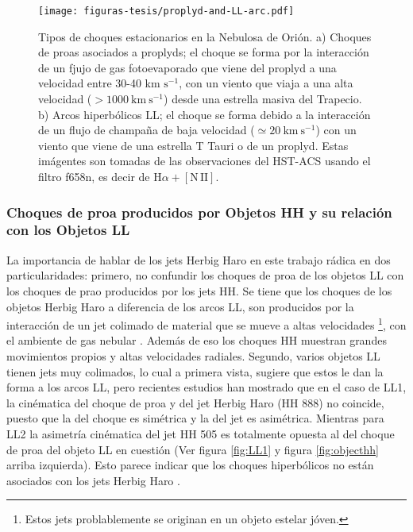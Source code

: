 \documentclass{article}
\newcommand\ha{\ensuremath{\mathrm{H}\alpha}}
\newcommand\nii{\ensuremath{\mathrm{[N\,II]}}}
\begin{document}
\begin{figure}
  \centering
  \texttt{[image: figuras-tesis/proplyd-and-LL-arc.pdf]}
  \caption{Tipos de choques estacionarios en la Nebulosa de Orión. a) Choques de proas asociados a proplyds; el choque se forma por la interacción de un fjujo de gas fotoevaporado que viene del proplyd a una velocidad entre 30-40 km \(\text{s}^{-1}\), con un viento que viaja a una alta velocidad (\(>1000 ~\text{km} ~\text{s}^{-1}\)) desde una estrella masiva del Trapecio. b) Arcos hiperbólicos LL; el choque se forma debido a la interacción de un flujo de champaña de baja velocidad (\(\simeq 20~\text{km} ~\text{s}^{-1}\)) con un viento que viene de una estrella T Tauri o de un proplyd. Estas imágentes son tomadas de las observaciones del HST-ACS usando el filtro f658n, es decir de \(\ha + \nii\). }
  \label{fig:proplydbow-objetoll}
\end{figure}

\subsubsection{Choques de proa producidos por  Objetos HH y su relación con los Objetos LL}
\label{sec:herbig}

La importancia de hablar de los jets Herbig Haro en este trabajo rádica en dos particularidades: primero, no confundir los choques de proa de los objetos LL con los choques de prao producidos por los jets HH. Se tiene que los choques de los objetos Herbig Haro a diferencia de los arcos LL, son producidos por la interacción de un jet colimado de material que se mueve a altas velocidades \footnote{Estos jets problablemente se originan en un objeto estelar jóven.}, con el ambiente de gas nebular \citep{Odell:1994}. Además de eso los choques HH muestran grandes movimientos propios y altas velocidades radiales. Segundo, varios objetos LL tienen jets muy colimados, lo cual a primera vista, sugiere que estos le dan la forma a los arcos LL, pero recientes estudios han mostrado que en el caso de LL1, la cinématica del choque de proa y del jet Herbig Haro (HH 888) no coincide, puesto que la del choque es simétrica y la del jet es asimétrica. Mientras para LL2 la asimetría cinématica del jet HH 505 es totalmente opuesta al del choque de proa del objeto LL en cuestión (Ver figura \ref{fig:LL1} y figura \ref{fig:objecthh} arriba izquierda). Esto parece indicar que los choques hiperbólicos no están asociados con los jets Herbig Haro \citep{Henney:2013a}. 
\end{document}
